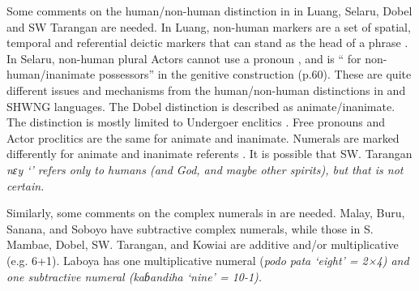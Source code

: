 Some comments on the human/non-human distinction in 
in Luang, Selaru, Dobel and SW Tarangan are needed.
In Luang, non-human markers are a set of spatial,
temporal and referential deictic markers that can stand as the
head of a phrase \citep[39f, 83f]{TaberTaber2015}.
In Selaru, non-human plural Actors cannot use a pronoun \citep[35]{Coward2005},
and is “{\0} for non-human/inanimate possessors” in the genitive construction (p.60).
These are quite different issues
and mechanisms from the human/non-human distinctions in  and SHWNG languages.
The Dobel distinction is described as animate/inanimate.
The distinction is mostly limited to  Undergoer enclitics \citep[140]{Hughes2000}.
Free pronouns and Actor proclitics are the same for animate and inanimate.
Numerals are marked differently for animate and inanimate referents \citep[155--157]{Hughes2000}.
It is possible that SW. Tarangan \it{nɛy} ‘’ refers only
to humans (and God, and maybe other spirits),
but that is not certain.

Similarly, some comments on the complex numerals in  are needed.
Malay, Buru, Sanana, and Soboyo have subtractive complex numerals,
while those in S. Mambae, Dobel, SW.
Tarangan, and Kowiai are additive and/or multiplicative (e.g. 6+1).
Laboya has one multiplicative numeral (\it{podo pata} ‘eight’
= 2×4) and one subtractive numeral (\it{kaɓandiha} ‘nine’ = 10-1).

